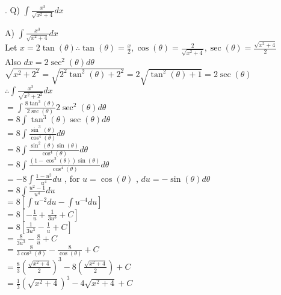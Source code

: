 \documentclass{article}
\newcounter{question}
\begin{document}
\newcommand\Que[1]{%
   \leavevmode\par
   \stepcounter{question}
   \noindent
   \thequestion. Q) #1\par}

\newcommand\Ans[2][]{%
    \leavevmode\par\noindent
   {A) \textbf{#1}#2\par}}

\Que{
    $ \int{\frac{x^3}{\sqrt{x^2+4}}}dx $\\
    }
\Ans{
    $ \int{\frac{x^3}{\sqrt{x^2+4}}} dx $\\

    Let $ x=2\tan(\theta)
    \therefore \tan(\theta) = \frac{x}{2}
    ,\cos(\theta) = \frac{2}{\sqrt{x^2+4}}
    , \sec(\theta) = \frac{\sqrt{x^2+4}}{2} $\\

    Also $ dx = 2\sec^2(\theta) d\theta $\\

    $ \sqrt{x^2+2^2} 
    = \sqrt{2^2\tan^2(\theta)+2^2} 
    = 2\sqrt{\tan^2(\theta)+1} 
    = 2\sec(\theta) $\\

    $ \therefore \int{\frac{x^3}{\sqrt{x^2+2^2}}} dx $\\

    $ = \int{\frac{8\tan^3(\theta)}{2\sec(\theta)}} 2\sec^2(\theta) d\theta $\\

    $ = 8\int{\tan^3(\theta)\sec(\theta)} d\theta $\\

    $ = 8\int{\frac{\sin^3(\theta)}{\cos^4(\theta)}} d\theta $\\

    $ = 8\int{\frac{\sin^2(\theta)\sin(\theta)}{\cos^4(\theta)}} d\theta $\\

    $ = 8\int{\frac{(1-\cos^2(\theta))\sin(\theta)}{\cos^4(\theta)}} d\theta $\\
    
    $ = -8\int{\frac{1-u^2}{u^4}} du $
    , for $u=\cos(\theta)$
    , $du=-\sin(\theta)d\theta $\\
    
    $ = 8\int{\frac{u^2-1}{u^4}} du $\\

    $ = 8[\int{u^{-2}}du - \int{u^{-4}} du] $ \\

    $ = 8[-\frac{1}{u} + \frac{1}{3u^3} + C] $ \\

    $ = 8[\frac{1}{3u^3} -\frac{1}{u} + C] $\\

    $ = \frac{8}{3u^3} -\frac{8}{u} + C $\\
    
    $ = \frac{8}{3\cos^3(\theta)} -\frac{8}{\cos(\theta)} + C $\\
    
    $ = \frac{8}{3}(\frac{\sqrt{x^2+4}}{2})^3 - 8(\frac{\sqrt{x^2+4}}{2}) + C $\\

    $ = \frac{1}{3}(\sqrt{x^2+4})^3 - 4\sqrt{x^2+4} + C $\\
}
\end{document}
